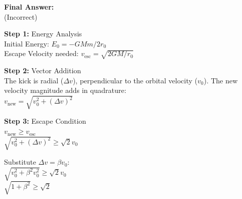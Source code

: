 \begin{minipage}[t!]{\linewidth}
\begin{tcolorbox}[
        title={\textbf{IPhO 2005 Q1}},
        colback=white,
        colframe=gray!50!black,
        arc=3pt,
        boxrule=1pt,
        fonttitle=\sffamily\large,
        width=\linewidth
    ]
\begin{minipage}[t]{0.49\linewidth}
\begin{tcolorbox}
                \textbf{Final Answer:}\\\vspace{1em}
                 (Incorrect)
            \end{tcolorbox}
        \end{minipage}%
        \hfill
        \begin{minipage}[t]{0.49\linewidth}
            \vspace{0pt}
            \begin{tcolorbox}[
                title={\small \textbf{RL-FINETUNED MODEL}},
                colframe=green!50!black,
                colback=green!5!white,
                coltitle=white,
                fontupper=\small\ttfamily\raggedright,
                boxrule=0.5pt,
                sharp corners,
                left=2pt, right=2pt,
                width=\linewidth,
                nobeforeafter
            ]
                \textbf{\textcolor{green!40!black}{Step 1:}} Energy Analysis\\
                Initial Energy: $E_0 = -GMm / 2r_0$\\
                Escape Velocity needed: $v_{\text{esc}} = \sqrt{2GM / r_0}$
                \vspace{1em}
                
                \textbf{\textcolor{green!40!black}{Step 2:}} Vector Addition\\
                The kick is radial ($\Delta v$), perpendicular to the orbital velocity ($v_0$). The new velocity magnitude adds in quadrature:\\
                $v_{\text{new}} = \sqrt{v_0^2 + (\Delta v)^2}$
                \vspace{1em}
                
                \textbf{\textcolor{green!40!black}{Step 3:}} Escape Condition\\
                $v_{\text{new}} \geq v_{\text{esc}}$\\
                $\sqrt{v_0^2 + (\Delta v)^2} \geq \sqrt{2} v_0$
                \vspace{0.5em}
                
                Substitute $\Delta v = \beta v_0$:\\
                $\sqrt{v_0^2 + \beta^2 v_0^2} \geq \sqrt{2} v_0$\\
                $\sqrt{1 + \beta^2} \geq \sqrt{2}$
                \vspace{1em}
                

\end{tcolorbox}
\end{minipage}
\end{tcolorbox}
\end{minipage}
